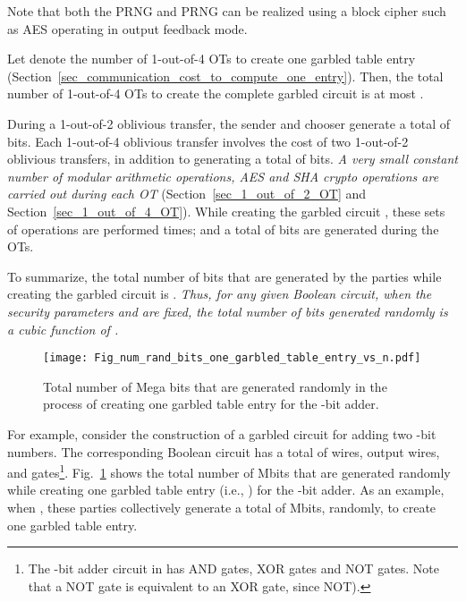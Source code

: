 \documentclass[10pt,journal,cspaper,compsoc]{IEEEtran}
\begin{document}
Note that both the PRNG  and PRNG  can be realized using a block cipher such as AES operating in output feedback mode.


Let  denote the number of 1-out-of-4 OTs to create one garbled table entry (Section~\ref{sec_communication_cost_to_compute_one_entry}). Then, the total number of 1-out-of-4 OTs to create the complete garbled circuit  is at most .


During a 1-out-of-2 oblivious transfer, the sender and chooser generate a total of  bits. Each 1-out-of-4 oblivious transfer involves the cost of two 1-out-of-2 oblivious transfers, in addition to generating a total of  bits. {\em A very small constant number of modular arithmetic operations, AES and SHA crypto operations are carried out during each OT} (Section~\ref{sec_1_out_of_2_OT} and Section~\ref{sec_1_out_of_4_OT}). While creating the garbled circuit , these sets of operations are performed  times; and a total of  bits are generated during the OTs.







To summarize, the total number of bits that are generated by the  parties while creating the garbled circuit is . {\em Thus, for any given Boolean circuit, when the security parameters  and  are fixed, the total number of bits generated randomly is a cubic function of .}

\begin{figure}[t]
\centering
\texttt{[image: Fig\_num\_rand\_bits\_one\_garbled\_table\_entry\_vs\_n.pdf]}
\vspace{-3 mm}
\caption{Total number of Mega bits that are generated randomly in the process of creating one garbled table entry for the -bit adder.\vspace{-2 mm}}
\label{fig_num_rand_bits}
\end{figure}


For example, consider the construction of a garbled circuit for adding two -bit numbers. The corresponding Boolean circuit has a total of  wires,  output wires, and  gates\footnote{The -bit adder circuit in \cite{boolean_circuits} has  AND gates,  XOR gates and  NOT gates. Note that a NOT gate is equivalent to an XOR gate, since NOT).}. Fig.~\ref{fig_num_rand_bits} shows the total number of Mbits that are generated randomly while creating one garbled table entry (i.e., ) for the -bit adder. As an example, when , these parties collectively generate a total of  Mbits, randomly, to create one garbled table entry.
\end{document}
